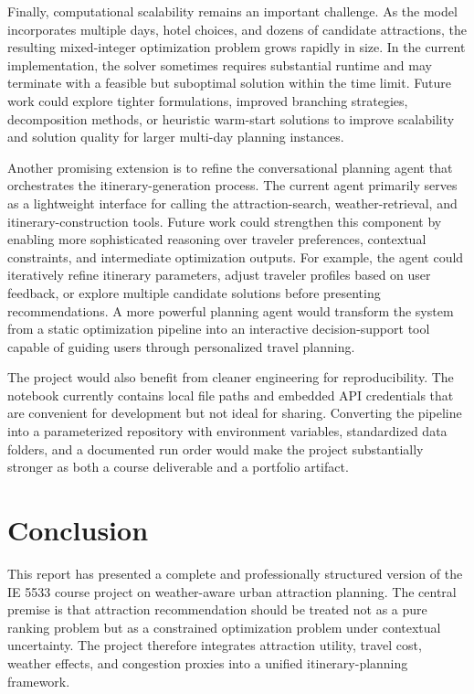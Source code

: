 \documentclass[12pt,a4paper]{article}
\begin{document}
Finally, computational scalability remains an important challenge. As the model incorporates multiple days, hotel choices, and dozens of candidate attractions, the resulting mixed-integer optimization problem grows rapidly in size. In the current implementation, the solver sometimes requires substantial runtime and may terminate with a feasible but suboptimal solution within the time limit. Future work could explore tighter formulations, improved branching strategies, decomposition methods, or heuristic warm-start solutions to improve scalability and solution quality for larger multi-day planning instances.

Another promising extension is to refine the conversational planning agent that orchestrates the itinerary-generation process. The current agent primarily serves as a lightweight interface for calling the attraction-search, weather-retrieval, and itinerary-construction tools. Future work could strengthen this component by enabling more sophisticated reasoning over traveler preferences, contextual constraints, and intermediate optimization outputs. For example, the agent could iteratively refine itinerary parameters, adjust traveler profiles based on user feedback, or explore multiple candidate solutions before presenting recommendations. A more powerful planning agent would transform the system from a static optimization pipeline into an interactive decision-support tool capable of guiding users through personalized travel planning.

The project would also benefit from cleaner engineering for reproducibility. The notebook currently contains local file paths and embedded API credentials that are convenient for development but not ideal for sharing. Converting the pipeline into a parameterized repository with environment variables, standardized data folders, and a documented run order would make the project substantially stronger as both a course deliverable and a portfolio artifact.

\section{Conclusion}

This report has presented a complete and professionally structured version of the IE 5533 course project on weather-aware urban attraction planning. The central premise is that attraction recommendation should be treated not as a pure ranking problem but as a constrained optimization problem under contextual uncertainty. The project therefore integrates attraction utility, travel cost, weather effects, and congestion proxies into a unified itinerary-planning framework.
\end{document}
